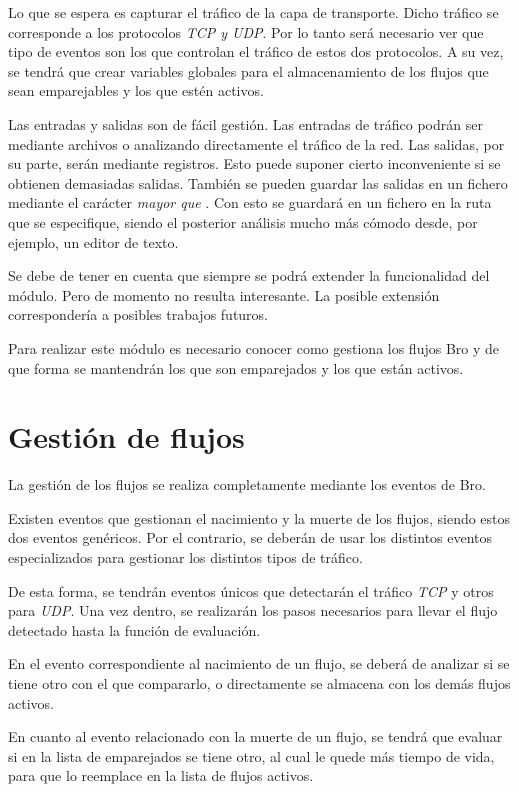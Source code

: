 \intro Lo que se espera es capturar el tráfico de la capa de transporte. Dicho tráfico se corresponde a los 
protocolos \textit{TCP y UDP}. Por lo tanto será necesario ver que tipo de eventos son los que controlan el tráfico 
de estos dos protocolos. A su vez, se tendrá que crear variables globales para el almacenamiento de los flujos que sean emparejables 
y los que estén activos.

\intro Las entradas y salidas son de fácil gestión. Las entradas de tráfico podrán ser mediante archivos o 
analizando directamente el tráfico de la red. Las salidas, por su parte, serán mediante registros. Esto puede 
suponer cierto inconveniente si se obtienen demasiadas salidas. También se pueden guardar las salidas en un 
fichero mediante el carácter \textit{mayor que} . Con esto se guardará en un fichero en la ruta que se especifique, siendo el 
posterior análisis mucho más cómodo desde, por ejemplo, un editor de texto.

\intro Se debe de tener en cuenta que siempre se podrá extender la funcionalidad del módulo. Pero de momento no 
resulta interesante. La posible extensión correspondería a posibles trabajos futuros.

\intro Para realizar este módulo es necesario conocer como gestiona los flujos Bro y de que forma se mantendrán 
los que son emparejados y los que están activos.

\section{Gestión de flujos}

La gestión de los flujos se realiza completamente mediante los eventos de Bro.

\intro Existen eventos que gestionan el nacimiento y la muerte de los flujos, siendo estos dos eventos genéricos. Por el contrario, 
se deberán de usar los distintos eventos especializados para gestionar los distintos tipos de tráfico.

\intro De esta forma, se tendrán eventos únicos que detectarán el tráfico \textit{TCP} y otros para \textit{UDP}. Una vez dentro, se 
realizarán los pasos necesarios para llevar el flujo detectado hasta la función de evaluación.

\intro En el evento correspondiente al nacimiento de un flujo, se deberá de analizar si se tiene otro con el que compararlo, o directamente se almacena con los demás flujos activos.

\intro En cuanto al evento relacionado con la muerte de un flujo, se tendrá que evaluar si en la lista de emparejados se tiene otro, al cual le quede más tiempo de vida, para que lo reemplace en la lista de flujos activos.

